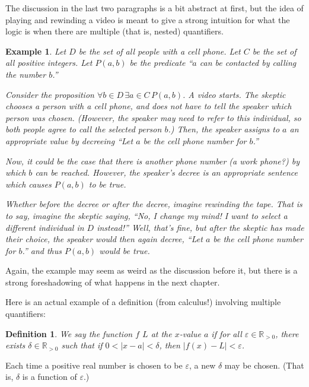 \documentclass{book}
\newcounter{ekcounter}%
\theoremstyle{ekimcustom}
\newtheorem{example}[ekcounter]{Example}
\newtheorem{definition}[ekcounter]{Definition}
\newcommand\defn[1]{{\color{blue}{\bf #1}}}
\begin{document}
The discussion in the last two paragraphs is a bit abstract at first, but the idea of playing and rewinding a video is meant to give a strong intuition for what the logic is when there are multiple (that is, nested) quantifiers.
\begin{example}
Let $D$ be the set of all people with a cell phone. Let $C$ be the set of all positive integers. Let $P(a,b)$ be the predicate ``$a$ can be contacted by calling the number $b$.''

Consider the proposition $\forall b \in D\,\exists a \in C\,P(a,b)$. A video starts. The skeptic chooses a person with a cell phone, and does not have to tell the speaker which person was chosen. (However, the speaker may need to refer to this individual, so both people agree to call the selected person $b$.) Then, the speaker assigns to $a$ an appropriate value by decreeing ``Let $a$ be the cell phone number for $b$.''

Now, it could be the case that there is another phone number (a work phone?) by which $b$ can be reached. However, the speaker's decree is an appropriate sentence which causes $P(a,b)$ to be true.

Whether before the decree or after the decree, imagine rewinding the tape. That is to say, imagine the skeptic saying, ``No, I change my mind! I want to select a different individual in $D$ instead!'' Well, that's fine, but after the skeptic has made their choice, the speaker would then again decree,  ``Let $a$ be the cell phone number for $b$.'' and thus $P(a,b)$ would be true.
\end{example}
Again, the example may seem as weird as the discussion before it, but there is a strong foreshadowing of what happens in the next chapter.

Here is an actual example of a definition (from calculus!) involving multiple quantifiers:
\begin{definition}
We say the function $f$ \defn{has a limit} $L$ at the $x$-value $a$ if for all $\varepsilon \in \mathbb{R}_{>0}$, there exists $\delta \in \mathbb{R}_{>0}$ such that if $0 < |x-a| < \delta$, then $|f(x)-L| < \varepsilon$.
\end{definition}
Each time a positive real number is chosen to be $\varepsilon$, a new $\delta$ may be chosen. (That is, $\delta$ is a function of $\varepsilon$.)
\end{document}
